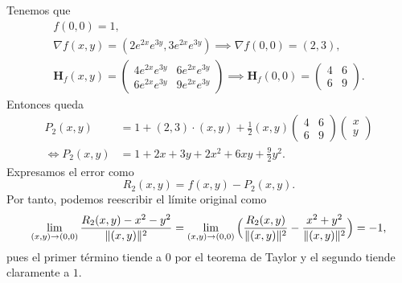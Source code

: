 \begin{solution}
    Tenemos que
    \begin{gather*}
        f(0,0) = 1,\\[.2cm]
        \nabla f(x,y) = \left(2e^{2x}e^{3y}, 3e^{2x}e^{3y}\right) \implies \nabla f(0,0) = (2,3),\\[.25cm]
        \boldsymbol{H}_f(x,y) = \left(\begin{array}{cc}
                4e^{2x}e^{3y} & 6e^{2x}e^{3y} \\[10pt]
                6e^{2x}e^{3y} & 9e^{2x}e^{3y}
            \end{array}\right) \implies \boldsymbol{H}_f(0,0) = \left(\begin{array}{cc}
                4 & 6 \\
                6 & 9
            \end{array}\right).
    \end{gather*}
    Entonces queda
    \[
        \begin{aligned}
            P_2(x,y)      & = 1+(2,3)\cdot(x,y)+\frac{1}{2}(x,y)\left(\begin{array}{cc}
                                                                              4 & 6 \\
                                                                              6 & 9
                                                                          \end{array}\right)
            \left(\begin{array}{cc}
                          x \\
                          y
                      \end{array}\right)                                                     \\[4pt]
            \iff P_2(x,y) & = 1 + 2x + 3y + 2x^2 + 6xy + \frac{9}{2}y^2.
        \end{aligned}
    \]
    Expresamos el error como
    \[
        R_2(x,y) = f(x,y) - P_2(x,y).
    \]
    Por tanto, podemos reescribir el límite original como
    \[\\[2pt]
        \lim_{(x,y) \to (0,0)} \frac{R_2(x,y) - x^2 - y^2}{\|(x,y)\|^2} =
        \lim_{(x,y) \to (0,0)} \Big( \frac{R_2(x,y)}{\|(x,y)\|^2} - \frac{x^2+y^2}{\|(x,y)\|^2} \Big) = -1,
    \]
    pues el primer término tiende a 0 por el teorema de Taylor  y el segundo  tiende claramente a $1.$
\end{solution}


